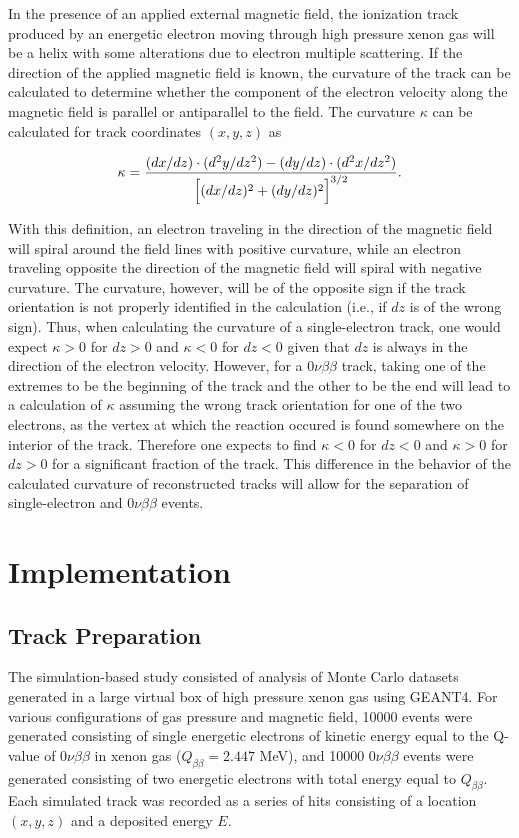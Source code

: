 \documentclass{JINST}
\begin{document}
In the presence of an applied external magnetic field, the ionization track produced by an energetic electron moving 
through high pressure xenon gas will be a helix with some alterations due to electron multiple scattering.  If the direction
of the applied magnetic field is known, the curvature of the track can be calculated to determine whether the component
of the electron velocity along the magnetic field is parallel or antiparallel to the field.  The curvature $\kappa$ can 
be calculated for track coordinates $(x,y,z)$ as

\begin{equation}\label{eqn_curv}
\kappa = \frac{(dx/dz)\cdot(d^2y/dz^2) - (dy/dz)\cdot(d^2x/dz^2)}{\Bigl[(dx/dz)^2 + (dy/dz)^2\Bigr]^{3/2}}.
\end{equation}

With this definition, an electron traveling in the direction of the magnetic field will spiral around the field lines with positive curvature, while an electron traveling opposite the direction of the magnetic field will spiral with negative curvature.  The curvature, however, will be of the opposite sign if the track orientation is not properly identified in the calculation (i.e., if $dz$ is of the wrong sign).  Thus, when calculating the curvature of a single-electron track, one would expect $\kappa > 0$ for $dz > 0$ and $\kappa < 0$ for $dz < 0$ given that $dz$ is always in the direction of the electron velocity.  However, for a $0\nu\beta\beta$ track, taking one of the extremes to be the beginning of the track and the other to be the end will lead to a calculation of $\kappa$ assuming the wrong track orientation for one of the two electrons, as the vertex at which the reaction occured is found somewhere on the interior of the track.  Therefore one expects to find $\kappa < 0$ for $dz < 0$ and $\kappa > 0$ for $dz > 0$ for a significant fraction of the track.  This difference in the behavior of the calculated curvature of reconstructed tracks will allow for the separation of single-electron and $0\nu\beta\beta$ events.

\section{Implementation}

\subsection{Track Preparation}\label{ssec:track}
The simulation-based study consisted of analysis of Monte Carlo datasets generated in a large virtual box of high pressure xenon gas using GEANT4.  For various configurations of gas pressure and magnetic field, 10000 events were generated consisting of single energetic electrons of kinetic energy equal to the Q-value of $0\nu\beta\beta$ in xenon gas ($Q_{\beta\beta} = 2.447$ MeV), and 10000 $0\nu\beta\beta$ events were generated consisting of two energetic electrons with total energy equal to $Q_{\beta\beta}$.  Each simulated track was recorded as a series of hits consisting of a location $(x,y,z)$ and a deposited energy $E$.
\end{document}
